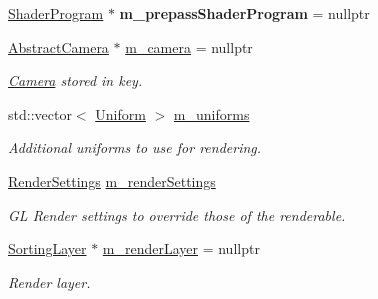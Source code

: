 \begin{DoxyCompactItemize}
\mbox{\hyperlink{classrev_1_1_shader_program}{Shader\+Program}} $\ast$ {\bfseries m\+\_\+prepass\+Shader\+Program} = nullptr
\item 
\mbox{\label{classrev_1_1_draw_command_a153592a557ab33e74342cfa2a80852e5}} 
\mbox{\hyperlink{classrev_1_1_abstract_camera}{Abstract\+Camera}} $\ast$ \mbox{\hyperlink{classrev_1_1_draw_command_a153592a557ab33e74342cfa2a80852e5}{m\+\_\+camera}} = nullptr
\begin{DoxyCompactList}\small\item\em \mbox{\hyperlink{classrev_1_1_camera}{Camera}} stored in key. \end{DoxyCompactList}\item 
\mbox{\label{classrev_1_1_draw_command_aabd1fc624213690cee3fe876368a58a6}} 
std\+::vector$<$ \mbox{\hyperlink{structrev_1_1_uniform}{Uniform}} $>$ \mbox{\hyperlink{classrev_1_1_draw_command_aabd1fc624213690cee3fe876368a58a6}{m\+\_\+uniforms}}
\begin{DoxyCompactList}\small\item\em Additional uniforms to use for rendering. \end{DoxyCompactList}\item 
\mbox{\label{classrev_1_1_draw_command_aba54d32e4279840257f3ff22e3fde210}} 
\mbox{\hyperlink{classrev_1_1_render_settings}{Render\+Settings}} \mbox{\hyperlink{classrev_1_1_draw_command_aba54d32e4279840257f3ff22e3fde210}{m\+\_\+render\+Settings}}
\begin{DoxyCompactList}\small\item\em GL Render settings to override those of the renderable. \end{DoxyCompactList}\item 
\mbox{\label{classrev_1_1_draw_command_a423765fc0b3f9caaa9627b3f0d757127}} 
\mbox{\hyperlink{structrev_1_1_sorting_layer}{Sorting\+Layer}} $\ast$ \mbox{\hyperlink{classrev_1_1_draw_command_a423765fc0b3f9caaa9627b3f0d757127}{m\+\_\+render\+Layer}} = nullptr
\begin{DoxyCompactList}\small\item\em Render layer. \end{DoxyCompactList}\item 
\mbox{\label{classrev_1_1_draw_command_a09fd2c6e7ae496a9d021baee1fe2f3a8}} 

\end{DoxyCompactItemize}
